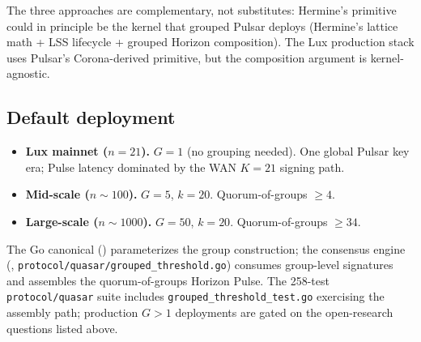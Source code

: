 The three approaches are complementary, not substitutes: Hermine's primitive could in principle be the kernel that grouped Pulsar deploys (Hermine's lattice math + LSS lifecycle + grouped Horizon composition). The Lux production stack uses Pulsar's Corona-derived primitive, but the composition argument is kernel-agnostic.

\subsection{Default deployment}

\begin{itemize}[leftmargin=2em,nosep]
  \item \textbf{Lux mainnet ($n = 21$).} $G = 1$ (no grouping needed). One global Pulsar key era; Pulse latency dominated by the WAN $K = 21$ signing path.
  \item \textbf{Mid-scale ($n \sim 100$).} $G = 5$, $k = 20$. Quorum-of-groups $\geq 4$.
  \item \textbf{Large-scale ($n \sim 1000$).} $G = 50$, $k = 20$. Quorum-of-groups $\geq 34$.
\end{itemize}

The Go canonical (\cite{pulsar}) parameterizes the group construction; the consensus engine (\cite{consensusgo}, \texttt{protocol/quasar/grouped\_threshold.go}) consumes group-level signatures and assembles the quorum-of-groups Horizon Pulse. The 258-test \texttt{protocol/quasar} suite includes \texttt{grouped\_threshold\_test.go} exercising the assembly path; production $G > 1$ deployments are gated on the open-research questions listed above.
